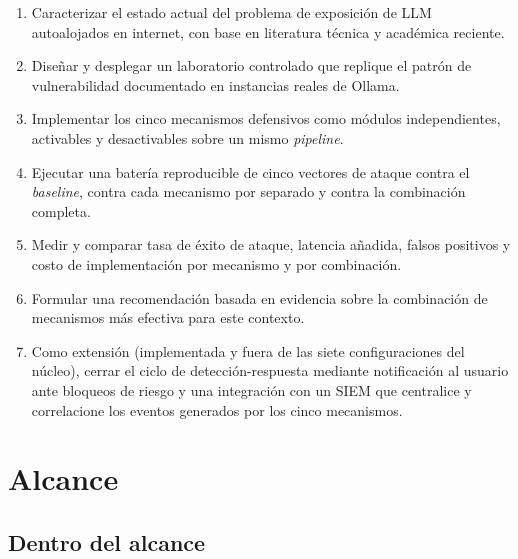 \documentclass[11pt,letterpaper]{article}
\begin{document}
\begin{enumerate}[leftmargin=1.4cm, itemsep=2pt]
\item Caracterizar el estado actual del problema de exposición de LLM autoalojados en internet, con base en literatura técnica y académica reciente.
\item Diseñar y desplegar un laboratorio controlado que replique el patrón de vulnerabilidad documentado en instancias reales de Ollama.
\item Implementar los cinco mecanismos defensivos como módulos independientes, activables y desactivables sobre un mismo \emph{pipeline}.
\item Ejecutar una batería reproducible de cinco vectores de ataque contra el \emph{baseline}, contra cada mecanismo por separado y contra la combinación completa.
\item Medir y comparar tasa de éxito de ataque, latencia añadida, falsos positivos y costo de implementación por mecanismo y por combinación.
\item Formular una recomendación basada en evidencia sobre la combinación de mecanismos más efectiva para este contexto.
\item Como extensión (implementada y fuera de las siete configuraciones del núcleo), cerrar el ciclo de detección-respuesta mediante notificación al usuario ante bloqueos de riesgo y una integración con un SIEM que centralice y correlacione los eventos generados por los cinco mecanismos.
\end{enumerate}

\section{Alcance}

\subsection{Dentro del alcance}
\end{document}
